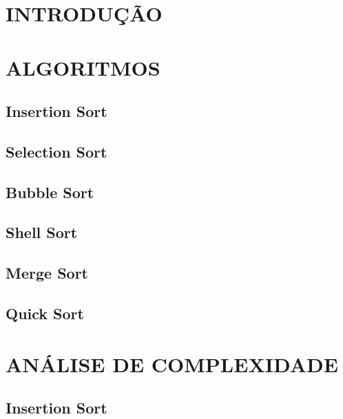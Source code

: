\documentclass[12pt,arial]{article}
\begin{document}
		\tableofcontents
		\newpage

		\section{INTRODUÇÃO}
		
		\newpage

            \section{ALGORITMOS}
		\subsection{Insertion Sort}
		
		\newpage

		\subsection{Selection Sort}
		
		\newpage

		\subsection{Bubble Sort}
		
		\newpage

		\subsection{Shell Sort}
		
		\newpage

		\subsection{Merge Sort}
		
		\newpage

		\subsection{Quick Sort}
		
		\newpage

            \section{ANÁLISE DE COMPLEXIDADE}
		\subsection{Insertion Sort}
		
	    \newpage
\end{document}
